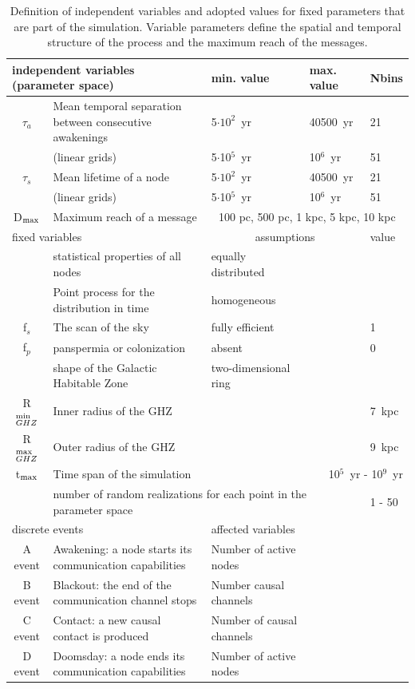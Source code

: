 \documentclass[crop]{CSLB}
\newcommand{\ceti}{node}
\newcommand{\cetis}{nodes}
\begin{document}
\setlength{\tabcolsep}{10pt}
\begin{table}
\centering
\begin{tabular}{cllll}
\hline
   \multicolumn{2}{l}{independent variables (parameter space)}
   &min. value&max. value&Nbins\\
\hline
   $\tau_{a}$ & Mean temporal separation between consecutive awakenings 
	      & 5$\cdot10^2$~yr & 40500~yr & 21\\ 
	    & (linear grids) & 5$\cdot$10$^5$~yr & 10$^6$~yr & 51\\ 
   $\tau_{s}$ & Mean lifetime of a \ceti{}
	      & 5$\cdot10^2$~yr & 40500~yr & 21\\ 
	    & (linear grids) & 5$\cdot$10$^5$~yr & 10$^6$~yr & 51\\ 
	D$_{\rm max}$ & Maximum reach of a message  & \multicolumn{3}{c}{100 pc, 500 pc, 1 kpc, 5 kpc, 10 kpc} \\
\hline
   \multicolumn{2}{l}{fixed variables} & \multicolumn{2}{c}{assumptions} &value \\
\hline
   & statistical properties of all \cetis{} &equally distributed&&\\
   & Point process for the distribution in time & homogeneous &&\\
   f$_s$ & The scan of the sky & fully efficient&&1\\
   f$_p$ & panspermia or colonization &absent&&0\\
   & shape of the Galactic Habitable Zone & two-dimensional ring &&\\
	R$_{GHZ}^{\rm min}$   & Inner radius of the GHZ  & \citet{lineweaver_galactic_2004} & & 7~kpc\\
   R$_{GHZ}^{\rm max}$   & Outer radius of the GHZ       & \citet{lineweaver_galactic_2004} & & 9~kpc\\
	t$_{\rm max}$ & Time span of the simulation  & &
   \multicolumn{2}{r}{10$^5$~yr - 10$^9$~yr} \\
    & \multicolumn{3}{l}{number of random realizations for each point
    in the parameter space} & 1 - 50 \\
\hline
   \multicolumn{2}{l}{discrete events} &
   \multicolumn{3}{l}{affected variables}\\
\hline
   A event & Awakening: a \ceti{} starts its communication capabilities &Number of active \cetis{}\\
   B event & Blackout: the end of the communication channel stops &Number causal channels\\
   C event & Contact: a new causal contact is produced &Number of causal channels\\
   D event & Doomsday: a \ceti{} ends its communication capabilities&Number of active \cetis{}\\
\hline

\hline
\end{tabular}
\caption{
   Definition of independent variables and adopted values for fixed
   parameters that are part of the simulation.  Variable parameters
   define the spatial and temporal structure of the process and the
   maximum reach of the messages.}
\label{T_simu_hypotheses}
\end{table}
 
\end{document}
